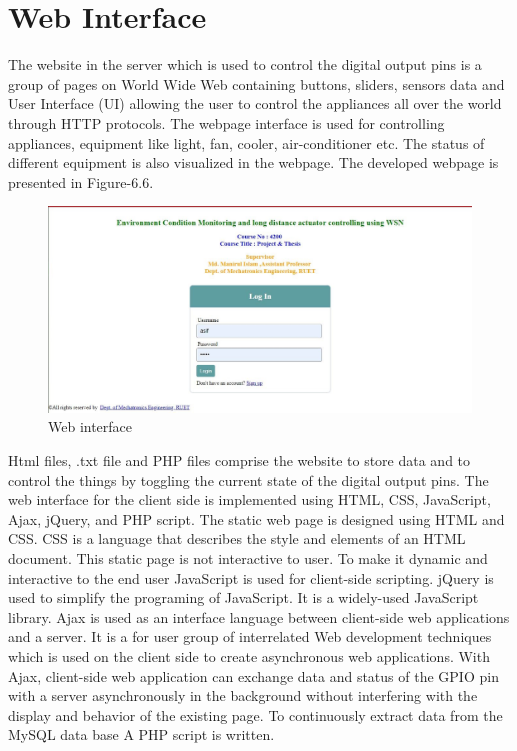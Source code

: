 \section{ Web Interface}
The website in the server which is used to control the digital output pins is a group of pages
on World Wide Web containing buttons, sliders, sensors data and User Interface (UI) allowing the user to control the appliances all over the world through HTTP protocols. The webpage interface is used for controlling appliances, equipment like light, fan, cooler, air-conditioner etc. The status of different equipment is also visualized in the webpage. The developed webpage is presented in Figure-6.6.
\begin{figure}[H]
  \centering
  \includegraphics[width=6in]{40}
  \caption{Web interface}\label{fig40}
\end{figure}
Html files, .txt file and PHP files comprise the website to store data and to control the things by toggling the current state of the digital output pins. The web interface for the client side is implemented using HTML, CSS, JavaScript, Ajax, jQuery, and PHP script. The static web page is designed using HTML and CSS. CSS is a language that describes the style and elements of an HTML document. This static page is not interactive to user. To make it dynamic and interactive to the end user JavaScript is used for client-side scripting. jQuery is used to simplify the programing of JavaScript. It is a widely-used JavaScript library. Ajax is used as an interface language between client-side web applications and a server. It is a for user group of interrelated Web development techniques which is used on the client side to create asynchronous web applications. With Ajax, client-side web application can exchange data and status of the GPIO pin with a server asynchronously in the background without interfering with the display and behavior of the existing page. To continuously extract data from the MySQL data base A PHP script is written.
